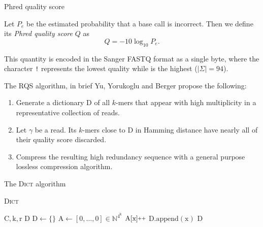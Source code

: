 \documentclass[12pt]{beamer}
\newcommand{\textapprox}{\raisebox{0.5ex}{\texttildelow}}
\newcommand{\pp}{\nolinebreak\hspace{-.05em}\raisebox{.4ex}{\tiny\bf +}\nolinebreak\raisebox{.4ex}{\tiny\bf +}\xspace}
\begin{document}
    \begin{frame}{Phred quality score}
        \begin{definition}
            Let \(P_e\) be the estimated probability that a base call is
            incorrect. Then we define its \emph{Phred quality score} \(Q\) as
            \[
                Q = -10\log_{10}{P_e}\text{.}
            \]
        \end{definition}

        \vspace{0.5cm}

        This quantity is encoded in the Sanger FASTQ format as a single byte,
        where the character \texttt{\textquotesingle!\textquotesingle}
        represents the lowest quality while
        \texttt{\textquotesingle\textapprox\textquotesingle} is the highest
        (\(\vert\Sigma\vert = 94\)).
    \end{frame}

    \begin{frame}{The RQS algorithm, in brief}
        Yu, Yorukoglu and Berger \cite{YYB14} propose the following:

        \vspace{0.25cm}

        \begin{enumerate}
            \item Generate a dictionary \(\text{D}\) of all \(k\)-mers that appear
                with high multiplicity in a representative collection of reads.
            \item Let \(\gamma\) be a read. Its \(k\)-mers close to \(\text{D}\) in
                Hamming distance have nearly all of their quality score discarded.
            \item Compress the resulting high redundancy sequence with a general
                purpose lossless compression algorithm.
        \end{enumerate}
    \end{frame}

    \begin{frame}{The \textsc{Dict} algorithm}
        \begin{algorithm}[H]
            \caption{\textsc{Dict}}
            \begin{algorithmic}[1]
                \REQUIRE \(\text{C}, \text{k}, \text{r}\)
                \ENSURE \(\text{D}\)
                \STATE \(\text{D} \leftarrow \{\}\)
                \STATE \(\text{A} \leftarrow [0,\dots,0] \in \mathbb{N}^{4^\text{k}}\)
                    \STATE \(\text{A}[\text{x}]\pp\)
                \ENDFOR
                        \STATE \(\text{D}.\text{append}(\text{x})\)
                    \ENDIF
                \ENDFOR
                \RETURN \(\text{D}\)
            \end{algorithmic}
        \end{algorithm}
    \end{frame}
\end{document}
